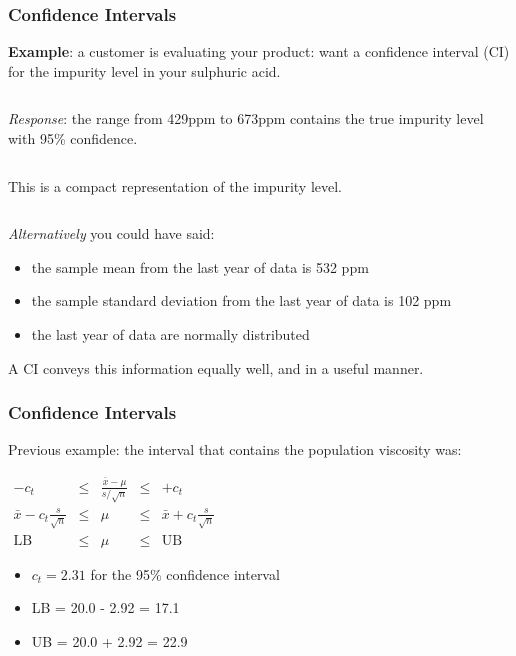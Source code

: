 \begin{frame}\frametitle{Confidence Intervals}

	\textbf{Example}: a customer is evaluating your product: want a confidence interval (CI) for the impurity level in your sulphuric acid.

	$\qquad$

	\emph{Response}: the range from 429ppm to 673ppm contains the true impurity level with 95\% confidence.

	$\qquad$

	This is a compact representation of the impurity level.

	$\qquad$

	\emph{Alternatively} you could have said:
	\begin{itemize}
		\item	the sample mean from the last year of data is 532 ppm
		\item	the sample standard deviation from the last year of data is 102 ppm
		\item	the last year of data are normally distributed
	\end{itemize}

	A CI conveys this information equally well, and in a useful manner.
\end{frame}

\begin{frame}\frametitle{Confidence Intervals}

	Previous example: the interval that contains the population viscosity was:

	$
	\begin{array}{rcccl}
		- c_t &\leq& \displaystyle \frac{\bar{x} - \mu}{s/\sqrt{n}} &\leq& +c_t\\
		\bar{x} - c_t \displaystyle \frac{s}{\sqrt{n}} &\leq& \mu &\leq& \bar{x} + c_t\displaystyle\frac{s}{\sqrt{n}} \\
		\text{LB} &\leq& \mu &\leq& \text{UB}
	\end{array}
	$
	\begin{itemize}
		\item	$c_t = 2.31$ for the 95\% confidence interval
		\item	LB = 20.0 - 2.92 = 17.1
		\item	UB = 20.0 + 2.92 = 22.9
	\end{itemize}
\end{frame}

